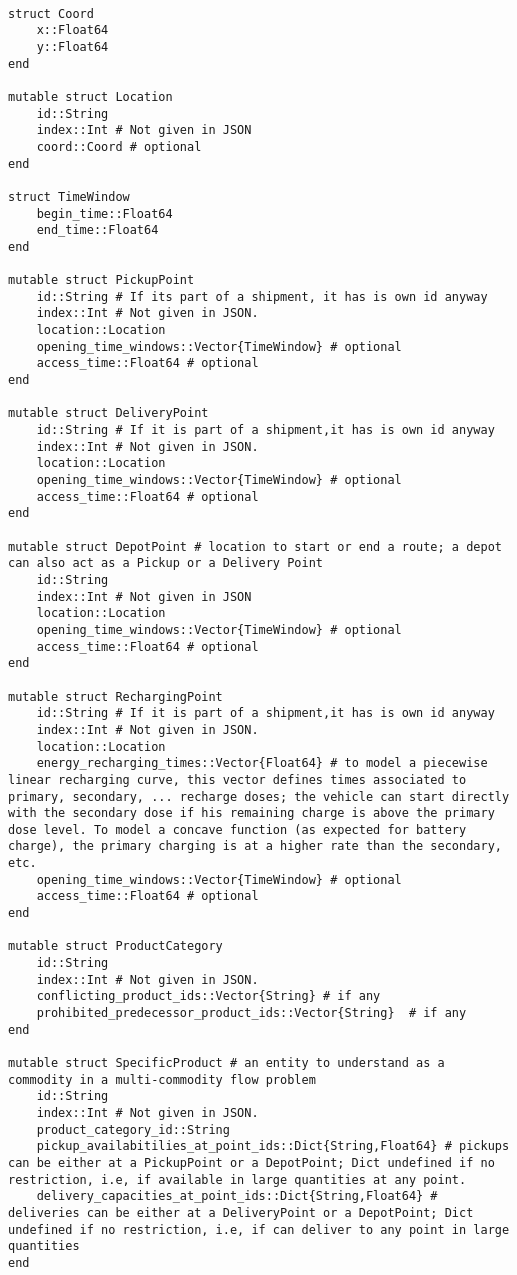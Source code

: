 \documentclass[12pt,a4paper]{article}
\begin{document}
\begin{verbatim}

struct Coord
    x::Float64
    y::Float64
end

mutable struct Location
    id::String
    index::Int # Not given in JSON
    coord::Coord # optional
end

struct TimeWindow
    begin_time::Float64
    end_time::Float64
end

mutable struct PickupPoint
    id::String # If its part of a shipment, it has is own id anyway
    index::Int # Not given in JSON. 
    location::Location
    opening_time_windows::Vector{TimeWindow} # optional
    access_time::Float64 # optional
end

mutable struct DeliveryPoint
    id::String # If it is part of a shipment,it has is own id anyway
    index::Int # Not given in JSON. 
    location::Location
    opening_time_windows::Vector{TimeWindow} # optional
    access_time::Float64 # optional
end

mutable struct DepotPoint # location to start or end a route; a depot can also act as a Pickup or a Delivery Point
    id::String
    index::Int # Not given in JSON
    location::Location
    opening_time_windows::Vector{TimeWindow} # optional
    access_time::Float64 # optional
end

mutable struct RechargingPoint
    id::String # If it is part of a shipment,it has is own id anyway
    index::Int # Not given in JSON. 
    location::Location
    energy_recharging_times::Vector{Float64} # to model a piecewise linear recharging curve, this vector defines times associated to primary, secondary, ... recharge doses; the vehicle can start directly with the secondary dose if his remaining charge is above the primary dose level. To model a concave function (as expected for battery charge), the primary charging is at a higher rate than the secondary, etc.
    opening_time_windows::Vector{TimeWindow} # optional
    access_time::Float64 # optional 
end

mutable struct ProductCategory
    id::String 
    index::Int # Not given in JSON. 
    conflicting_product_ids::Vector{String} # if any
    prohibited_predecessor_product_ids::Vector{String}  # if any
end

mutable struct SpecificProduct # an entity to understand as a commodity in a multi-commodity flow problem
    id::String 
    index::Int # Not given in JSON. 
    product_category_id::String
    pickup_availabitilies_at_point_ids::Dict{String,Float64} # pickups can be either at a PickupPoint or a DepotPoint; Dict undefined if no restriction, i.e, if available in large quantities at any point.
    delivery_capacities_at_point_ids::Dict{String,Float64} # deliveries can be either at a DeliveryPoint or a DepotPoint; Dict undefined if no restriction, i.e, if can deliver to any point in large quantities
end


\end{verbatim}
\end{document}
